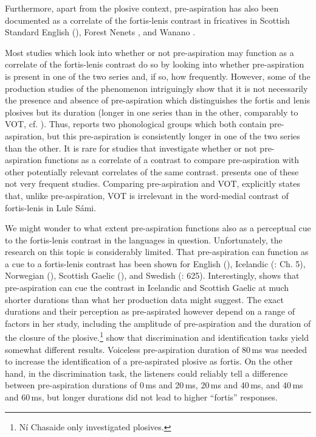 \documentclass[output=paper]{langscibook}
\begin{document}
Furthermore, apart from the plosive context, pre\hyp aspiration has also been documented as a correlate of the fortis-lenis contrast in fricatives in Scottish Standard English (\citealt{GordeevaScobbie2010,GordeevaScobbie2013}), Forest Nenets \citep{Salminen2007}, and Wanano \citep[50--51]{Stenzel2004}. 

Most studies which look into whether or not pre\hyp aspiration may function as a correlate of the fortis-lenis contrast do so by looking into whether pre\hyp aspiration is present in one of the two series and, if so, how frequently. However, some of the production studies of the phenomenon intriguingly show that it is not necessarily the presence and absence of pre\hyp aspiration which distinguishes the fortis and lenis plosives but its duration (longer in one series than in the other, comparably to VOT, cf. \citealt{DiCanio2012, MorrisHejná2020, NanceStuart-Smith2013}). Thus, \citet{DiCanio2012} reports two phonological groups which both contain pre-aspiration, but this pre\hyp aspiration is consistently longer in one of the two series than the other. It is rare for studies that investigate whether or not pre\hyp aspiration functions as a correlate of a contrast to compare pre\hyp aspiration with other potentially relevant correlates of the same contrast. \citet{Engstrand1987} presents one of these not very frequent studies. Comparing pre\hyp aspiration and VOT, \citet[103]{Engstrand1987} explicitly states that, unlike pre-aspiration, VOT is irrelevant in the word-medial contrast of fortis-lenis in Lule Sámi.

We might wonder to what extent pre\hyp aspiration functions also as a perceptual cue to the fortis-lenis contrast in the languages in question. Unfortunately, the research on this topic is considerably limited. That pre\hyp aspiration can function as a cue to a fortis-lenis contrast has been shown for English (\citealt{HejnáKimper2019}), Icelandic (\citealt{Chasaide1985}: Ch. 5), Norwegian (\citealt{Dommelen1999}), Scottish Gaelic (\cites{Clayton2010}[Ch. 5]{Chasaide1985}), and Swedish (\citealt{HelgasonRingen2008}: 625). Interestingly, \citet[435]{Chasaide1985} shows that pre\hyp aspiration can cue the contrast in Icelandic and Scottish Gaelic at much shorter durations than what her production data might suggest. The exact durations and their perception as pre-aspirated however depend on a range of factors in her study, including the amplitude of pre\hyp aspiration and the duration of the closure of the plosive.\footnote{Ní Chasaide only investigated plosives.} \citet{HejnáKimper2019} show that discrimination and identification tasks yield somewhat different results. Voiceless pre\hyp aspiration duration of 80\,ms was needed to increase the identification of a pre-aspirated plosive as fortis. On the other hand, in the discrimination task, the listeners could reliably tell a difference between pre\hyp aspiration durations of 0\,ms and 20\,ms, 20\,ms and 40\,ms, and 40\,ms and 60\,ms, but longer durations did not lead to higher “fortis” responses.
\end{document}
